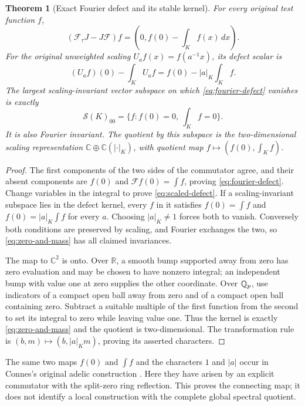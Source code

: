 \documentclass[11pt,a4paper]{article}
\newtheorem{theorem}{Theorem}[section]
\theoremstyle{definition}\newtheorem{definition}[theorem]{Definition}
\newcommand{\C}{\mathbb C}\newcommand{\R}{\mathbb R}
\newcommand{\Sch}{\mathcal S}\newcommand{\im}{\operatorname{im}}
\begin{document}
\begin{theorem}[Exact Fourier defect and its stable kernel]\label{thm:fourier-defect}
For every original test function $f$,
\begin{equation}\label{eq:fourier-defect}
 (\mathcal F_\tau J-J\mathcal F)f
 =\left(0,f(0)-\int_Kf(x)\,dx\right).
\end{equation}
For the original unweighted scaling $U_af(x)=f(a^{-1}x)$, its defect scalar is
\begin{equation}\label{eq:scaled-defect}
 (U_af)(0)-\int_KU_af=f(0)-|a|_K\int_Kf.
\end{equation}
The largest scaling-invariant vector subspace on which \eqref{eq:fourier-defect} vanishes is exactly
\begin{equation}\label{eq:zero-and-mass}
 \Sch(K)_{00}=\{f:f(0)=0,\ \int_Kf=0\}.
\end{equation}
It is also Fourier invariant. The quotient by this subspace is the two-dimensional scaling representation $\C\oplus\C(|\cdot|_K)$, with quotient map $f\mapsto(f(0),\int_Kf)$.
\end{theorem}
\begin{proof}
The first components of the two sides of the commutator agree, and their absent components are $f(0)$ and $\mathcal Ff(0)=\int f$, proving \eqref{eq:fourier-defect}. Change variables in the integral to prove \eqref{eq:scaled-defect}. If a scaling-invariant subspace lies in the defect kernel, every $f$ in it satisfies $f(0)=\int f$ and $f(0)=|a|_K\int f$ for every $a$. Choosing $|a|_K\ne1$ forces both to vanish. Conversely both conditions are preserved by scaling, and Fourier exchanges the two, so \eqref{eq:zero-and-mass} has all claimed invariances.

The map to $\C^2$ is onto. Over $\R$, a smooth bump supported away from zero has zero evaluation and may be chosen to have nonzero integral; an independent bump with value one at zero supplies the other coordinate. Over $\mathbb Q_p$, use indicators of a compact open ball away from zero and of a compact open ball containing zero. Subtract a suitable multiple of the first function from the second to set its integral to zero while leaving value one. Thus the kernel is exactly \eqref{eq:zero-and-mass} and the quotient is two-dimensional. The transformation rule is $(b,m)\mapsto(b,|a|_Km)$, proving its asserted characters.
\end{proof}

The same two maps $f(0)$ and $\int f$ and the characters $1$ and $|a|$ occur in Connes's original adelic construction \cite[Section III, (6)--(11)]{Connes1998}. Here they have arisen by an explicit commutator with the split-zero ring reflection. This proves the connecting map; it does not identify a local construction with the complete global spectral quotient.
\end{document}
